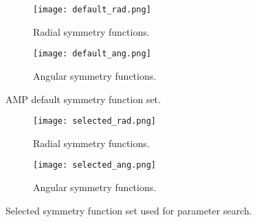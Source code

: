 \begin{figure}[H]
\begin{adjustbox}{max width=1.2\linewidth,center}
\centering
  \begin{subfigure}[b]{0.55\textwidth}
      \texttt{[image: default\_rad.png]}
      \caption{Radial symmetry functions.}
    \label{fig:f1}
  \end{subfigure}
  \hfill
  \begin{subfigure}[b]{0.55\textwidth}
      \texttt{[image: default\_ang.png]}
      \caption{Angular symmetry functions.}
    \label{fig:f2}
  \end{subfigure}
\end{adjustbox}
    \caption{AMP default symmetry function set.}
    \label{fig:default}
\end{figure}

\begin{figure}[H]
\begin{adjustbox}{max width=1.2\linewidth,center}
\centering
  \begin{subfigure}[b]{0.55\textwidth}
      \texttt{[image: selected\_rad.png]}
      \caption{Radial symmetry functions.}
    \label{fig:f1}
  \end{subfigure}
  \hfill
  \begin{subfigure}[b]{0.55\textwidth}
      \texttt{[image: selected\_ang.png]}
      \caption{Angular symmetry functions.}
    \label{fig:f2}
  \end{subfigure}
\end{adjustbox}
    \caption{Selected symmetry function set used for parameter search.}
    \label{fig:selected}
\end{figure}

